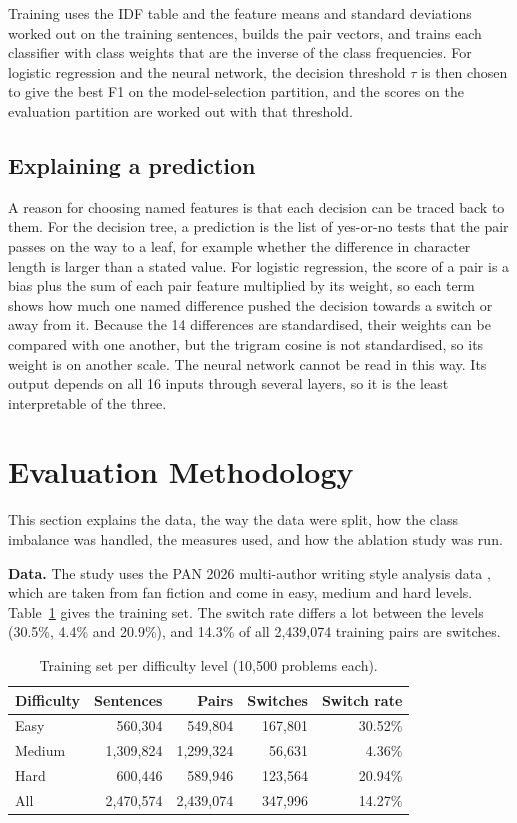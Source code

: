 \documentclass[runningheads]{llncs}
\newcommand{\tablefont}{\scriptsize\setlength{\tabcolsep}{3pt}}
\begin{document}
Training uses the IDF table and the feature means and standard deviations worked out on the training sentences, builds the pair vectors, and trains each classifier with class weights that are the inverse of the class frequencies. For logistic regression and the neural network, the decision threshold $\tau$ is then chosen to give the best F1 on the model-selection partition, and the scores on the evaluation partition are worked out with that threshold.

\subsection{Explaining a prediction}

A reason for choosing named features is that each decision can be traced back to them. For the decision tree, a prediction is the list of yes-or-no tests that the pair passes on the way to a leaf, for example whether the difference in character length is larger than a stated value. For logistic regression, the score of a pair is a bias plus the sum of each pair feature multiplied by its weight, so each term shows how much one named difference pushed the decision towards a switch or away from it. Because the 14 differences are standardised, their weights can be compared with one another, but the trigram cosine is not standardised, so its weight is on another scale. The neural network cannot be read in this way. Its output depends on all 16 inputs through several layers, so it is the least interpretable of the three.

\section{Evaluation Methodology}
\label{sec:eval}

This section explains the data, the way the data were split, how the class imbalance was handled, the measures used, and how the ablation study was run.

\textbf{Data.} The study uses the PAN 2026 multi-author writing style analysis data \cite{zangerle_2026_19068843}, which are taken from fan fiction and come in easy, medium and hard levels. Table~\ref{tab:data} gives the training set. The switch rate differs a lot between the levels (30.5\%, 4.4\% and 20.9\%), and 14.3\% of all 2,439,074 training pairs are switches.

\begin{table}[t]
\centering
\caption{Training set per difficulty level (10,500 problems each).}
\label{tab:data}
\tablefont
\begin{tabular}{lrrrr}
\toprule
\textbf{Difficulty} & \textbf{Sentences} & \textbf{Pairs} & \textbf{Switches} & \textbf{Switch rate} \\
\midrule
Easy   & 560,304   & 549,804   & 167,801 & 30.52\% \\
Medium & 1,309,824 & 1,299,324 & 56,631  & 4.36\% \\
Hard   & 600,446   & 589,946   & 123,564 & 20.94\% \\
\midrule
All    & 2,470,574 & 2,439,074 & 347,996 & 14.27\% \\
\bottomrule
\end{tabular}
\end{table}
\end{document}
